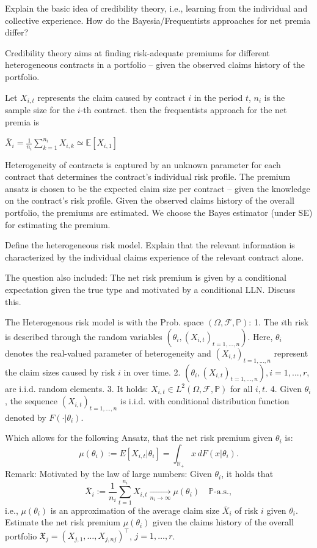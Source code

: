 Explain the basic idea of credibility theory, i.e., learning from the individual and
collective experience. How do the Bayesia/Frequentists approaches for net premia differ?

Credibility theory aims at finding risk-adequate premiums for different heterogeneous contracts in a
portfolio – given the observed claims history of the portfolio.

Let \( X_{i,t} \) represents the claim caused by contract \( i \) in the period \( t \), \( n_i \) is the sample size for the 
\( i \)-th contract.
then the frequentists approach for the net premia is

\( \overline{X}_i = \frac{1}{n_i} \sum_{k=1}^{n_i} X_{i,k} \simeq \mathbb{E}[X_{i, 1}] \)

Heterogeneity of contracts is captured by an unknown parameter for each contract that determines
the contract’s individual risk profile. The premium ansatz is chosen to be the expected claim size per
contract – given the knowledge on the contract’s risk profile.
Given the observed claims history of the overall portfolio, the premiums are estimated.
We choose the Bayes estimator (under SE) for estimating the premium.


Define the heterogeneous risk model. Explain that the relevant
information is characterized by the individual claims experience of the relevant
contract alone.

The question also included: The net risk premium is given by a conditional expectation given the true type and motivated by a conditional LLN. 
Discuss this.

The Heterogenous risk model is with the Prob. space \((\Omega, \mathcal{F}, \mathbb{P})\):
1. The \(i\)th risk is described through the random variables \((\theta_i, (X_{i,t})_{t=1,...,n})\). Here, \(\theta_i\) denotes the real-valued parameter of heterogeneity and \((X_{i,t})_{t=1,...,n}\) represent the claim sizes caused by risk \(i\) in over time.
2. \((\theta_i, (X_{i,t})_{t=1,...,n}), i = 1, ..., r\), are i.i.d. random elements.
3. It holds: \(X_{i,t} \in L^2 (\Omega, \mathcal{F}, \mathbb{P})\) for all \(i, t\).
4. Given \(\theta_i\), the sequence \((X_{i,t})_{t=1,...,n}\) is i.i.d. with conditional distribution function denoted by \(F(\cdot | \theta_i)\).

Which allows for the following Ansatz, that the net risk premium given \(\theta_i\) is:
\[
\mu(\theta_i) := E[X_{i,t} | \theta_i] = \int_{\mathbb{R_+}} x \, dF(x | \theta_i).
\]
Remark: Motivated by the law of large numbers: Given \(\theta_i\), it holds that
\[
\bar{X}_i := \frac{1}{n_i} \sum_{t=1}^{n_i} X_{i,t} \xrightarrow[n_i \to \infty]{} \mu(\theta_i) \quad \mathbb{P}\text{-a.s.},
\]
i.e., \(\mu(\theta_i)\) is an approximation of the average claim size \(\bar{X}_i\) of risk \(i\) given \(\theta_i\).
Estimate the net risk premium \( \mu(\theta_i) \) given the claims history of the overall portfolio
\( \mathfrak{X}_j = (X_{j,1}, \dots, X_{j,nj})^\top \), \(j = 1, \dots, r\).

